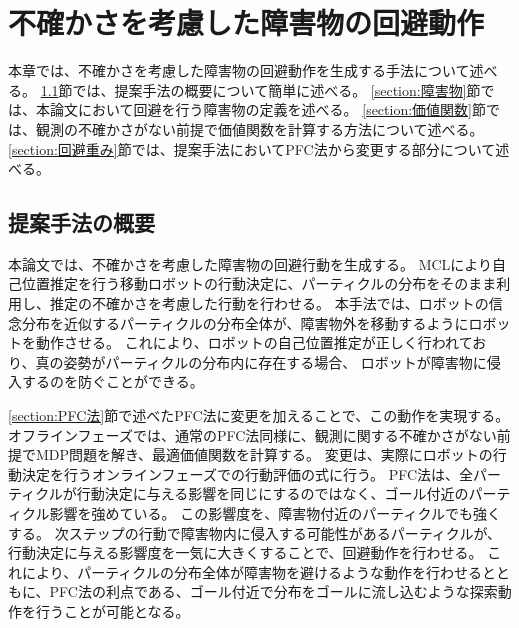 \chapter{不確かさを考慮した障害物の回避動作} \label{chapter:method}
本章では、不確かさを考慮した障害物の回避動作を生成する手法について述べる。
\ref{section:method overview}節では、提案手法の概要について簡単に述べる。
\ref{section:障害物}節では、本論文において回避を行う障害物の定義を述べる。
\ref{section:価値関数}節では、観測の不確かさがない前提で価値関数を計算する方法について述べる。
\ref{section:回避重み}節では、提案手法においてPFC法から変更する部分について述べる。


\section{提案手法の概要} \label{section:method overview}
本論文では、不確かさを考慮した障害物の回避行動を生成する。
MCLにより自己位置推定を行う移動ロボットの行動決定に、パーティクルの分布をそのまま利用し、推定の不確かさを考慮した行動を行わせる。
本手法では、ロボットの信念分布を近似するパーティクルの分布全体が、障害物外を移動するようにロボットを動作させる。
これにより、ロボットの自己位置推定が正しく行われており、真の姿勢がパーティクルの分布内に存在する場合、
ロボットが障害物に侵入するのを防ぐことができる。



\ref{section:PFC法}節で述べたPFC法に変更を加えることで、この動作を実現する。
オフラインフェーズでは、通常のPFC法同様に、観測に関する不確かさがない前提でMDP問題を解き、最適価値関数を計算する。
変更は、実際にロボットの行動決定を行うオンラインフェーズでの行動評価の式に行う。
PFC法は、全パーティクルが行動決定に与える影響を同じにするのではなく、ゴール付近のパーティクル影響を強めている。
この影響度を、障害物付近のパーティクルでも強くする。
次ステップの行動で障害物内に侵入する可能性があるパーティクルが、行動決定に与える影響度を一気に大きくすることで、回避動作を行わせる。
これにより、パーティクルの分布全体が障害物を避けるような動作を行わせるとともに、PFC法の利点である、ゴール付近で分布をゴールに流し込むような探索動作を行うことが可能となる。


